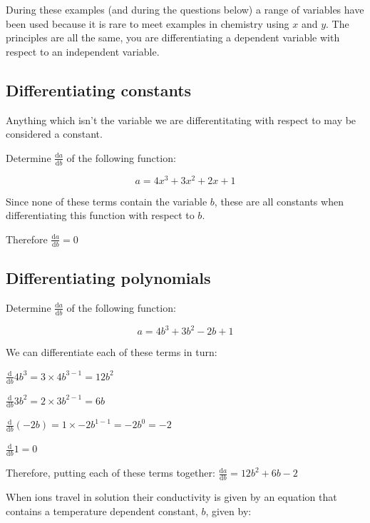 \documentclass[
]{book}
\begin{document}
During these examples (and during the questions below) a range of variables have been used because it is rare to meet examples in chemistry using \(x\) and \(y\). The principles are all the same, you are differentiating a dependent variable with respect to an independent variable.

\hypertarget{subsec:exdiffconsts}{%
\subsection{Differentiating constants}\label{subsec:exdiffconsts}}

Anything which isn't the variable we are differentitating with respect to may be considered a constant.

Determine \(\frac{\textrm{d}a}{\textrm{d}b}\) of the following function:

\begin{equation*}
a = 4x^3 + 3x^2 + 2x + 1
\end{equation*}

Since none of these terms contain the variable \(b\), these are all constants when differentiating this function with respect to \(b\).

Therefore \(\frac{\textrm{d}a}{\textrm{d}b}=0\)

\hypertarget{subsec:exdiffpoly}{%
\subsection{Differentiating polynomials}\label{subsec:exdiffpoly}}

Determine \(\frac{\textrm{d}a}{\textrm{d}b}\) of the following function:

\begin{equation*}
a = 4b^3 + 3b^2 - 2b + 1
\end{equation*}

We can differentiate each of these terms in turn:

\(\frac{\textrm{d}}{\textrm{d}b}4b^3 = 3 \times 4b^{3-1}= 12b^2\)

\(\frac{\textrm{d}}{\textrm{d}b}3b^2 = 2 \times 3b^{2-1}= 6b\)

\(\frac{\textrm{d}}{\textrm{d}b}(-2b) = 1 \times -2b^{1-1}= -2b^0 = -2\)

\(\frac{\textrm{d}}{\textrm{d}b}1 = 0\)

Therefore, putting each of these terms together: \(\frac{\textrm{d}a}{\textrm{d}b}=12b^2+6b-2\)

When ions travel in solution their conductivity is given by an equation that contains a temperature dependent constant, \(b\), given by:
\end{document}
